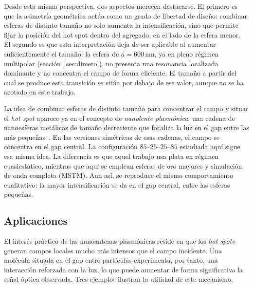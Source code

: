 Desde esta misma perspectiva, dos aspectos merecen destacarse. El primero es que la
asimetría geométrica actúa como un grado de libertad de diseño: combinar
esferas de distinto tamaño no solo aumenta la intensificación, sino que
permite fijar la posición del hot spot dentro del agregado, en el lado de la
esfera menor. El segundo es que esta interpretación deja de ser aplicable al aumentar
suficientemente el tamaño: la esfera de $a=600\,\text{nm}$, ya en pleno
régimen multipolar (sección~\ref{sec:dimero}), no presenta una resonancia
localizada dominante y no concentra el campo de forma eficiente. El tamaño a
partir del cual se produce esta transición se sitúa por debajo de ese valor,
aunque no se ha acotado en este trabajo.

La idea de combinar esferas de distinto tamaño para concentrar el campo y
situar el \emph{hot spot} aparece ya en el concepto de \emph{nanolente
plasmónica}, una cadena de nanoesferas metálicas de tamaño decreciente que
focaliza la luz en el gap entre las más pequeñas~\cite{Li2003}. En las
versiones simétricas de esas cadenas, el campo se concentra en el gap
central. La configuración $85$--$25$--$25$--$85$ estudiada aquí sigue esa
misma idea. La diferencia es que aquel trabajo usa plata en régimen
cuasiestático, mientras que aquí se emplean esferas de oro mayores y
simulación de onda completa (MSTM). Aun así, se reproduce el mismo 
comportamiento cualitativo: la
mayor intensificación se da en el gap central, entre las esferas pequeñas.

\subsection{Aplicaciones}
\label{subsec:aplicaciones_antena}
 
El interés práctico de las nanoantenas plasmónicas reside en que los
\emph{hot spots} generan campos locales mucho más intensos que el campo
incidente. Una molécula situada en el gap entre partículas experimenta,
por tanto, una interacción reforzada con la luz, lo que puede aumentar de
forma significativa la señal óptica observada. Tres ejemplos ilustran la
utilidad de este mecanismo.
 
